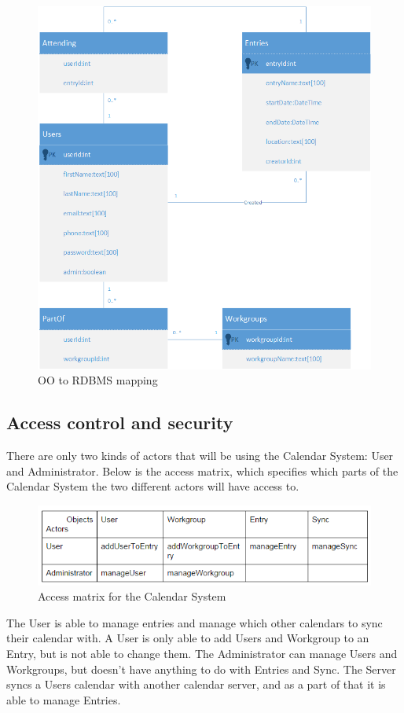 \begin{figure}[h]
\centering
\includegraphics[scale = 0.6]{rdbms}
\caption{OO to RDBMS mapping}
\end{figure}

\pagebreak

\subsection{Access control and security}
There are only two kinds of actors that will be using the Calendar System: User and Administrator. Below is the access matrix, which specifies which parts of the Calendar System the two different actors will have access to.

\begin{figure}[h]
\centering
\includegraphics[scale = 0.8]{accessControl}
\caption{Access matrix for the Calendar System}
\end{figure}
The User is able to manage entries and manage which other calendars to sync their calendar with. A User is only able to add Users and Workgroup to an Entry, but is not able to change them.
The Administrator can manage Users and Workgroups, but doesn’t have anything to do with Entries and Sync.
The Server syncs a Users calendar with another calendar server, and as a part of that it is able to manage Entries.

